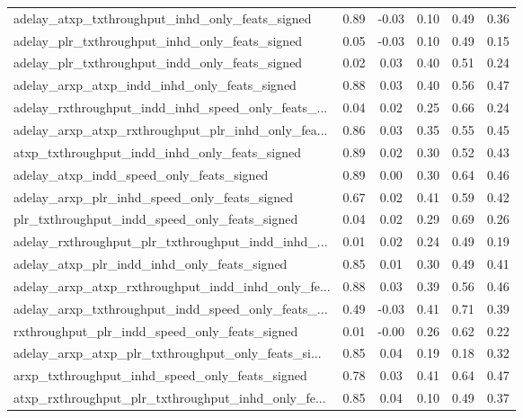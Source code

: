 \begin{tabular}{|l|*{4}{c}|r|}
adelay\_atxp\_txthroughput\_inhd\_only\_feats\_signed    & 0.89 & -0.03 &    0.10 &       0.49 &  0.36 \\
adelay\_plr\_txthroughput\_inhd\_only\_feats\_signed     & 0.05 & -0.03 &    0.10 &       0.49 &  0.15 \\
adelay\_plr\_txthroughput\_indd\_only\_feats\_signed     & 0.02 &  0.03 &    0.40 &       0.51 &  0.24 \\
adelay\_arxp\_atxp\_indd\_inhd\_only\_feats\_signed       & 0.88 &  0.03 &    0.40 &       0.56 &  0.47 \\
adelay\_rxthroughput\_indd\_inhd\_speed\_only\_feats\_... & 0.04 &  0.02 &    0.25 &       0.66 &  0.24 \\
adelay\_arxp\_atxp\_rxthroughput\_plr\_inhd\_only\_fea... & 0.86 &  0.03 &    0.35 &       0.55 &  0.45 \\
atxp\_txthroughput\_indd\_inhd\_only\_feats\_signed      & 0.89 &  0.02 &    0.30 &       0.52 &  0.43 \\
adelay\_atxp\_indd\_speed\_only\_feats\_signed           & 0.89 &  0.00 &    0.30 &       0.64 &  0.46 \\
adelay\_arxp\_plr\_inhd\_speed\_only\_feats\_signed       & 0.67 &  0.02 &    0.41 &       0.59 &  0.42 \\
plr\_txthroughput\_indd\_speed\_only\_feats\_signed      & 0.04 &  0.02 &    0.29 &       0.69 &  0.26 \\
adelay\_rxthroughput\_plr\_txthroughput\_indd\_inhd\_... & 0.01 &  0.02 &    0.24 &       0.49 &  0.19 \\
adelay\_atxp\_plr\_indd\_inhd\_only\_feats\_signed        & 0.85 &  0.01 &    0.30 &       0.49 &  0.41 \\
adelay\_arxp\_atxp\_rxthroughput\_indd\_inhd\_only\_fe... & 0.88 &  0.03 &    0.39 &       0.56 &  0.46 \\
adelay\_arxp\_txthroughput\_indd\_speed\_only\_feats\_... & 0.49 & -0.03 &    0.41 &       0.71 &  0.39 \\
rxthroughput\_plr\_indd\_speed\_only\_feats\_signed      & 0.01 & -0.00 &    0.26 &       0.62 &  0.22 \\
adelay\_arxp\_atxp\_plr\_txthroughput\_only\_feats\_si... & 0.85 &  0.04 &    0.19 &       0.18 &  0.32 \\
arxp\_txthroughput\_inhd\_speed\_only\_feats\_signed     & 0.78 &  0.03 &    0.41 &       0.64 &  0.47 \\
atxp\_rxthroughput\_plr\_txthroughput\_inhd\_only\_fe... & 0.85 &  0.04 &    0.10 &       0.49 &  0.37 \\

\end{tabular}
